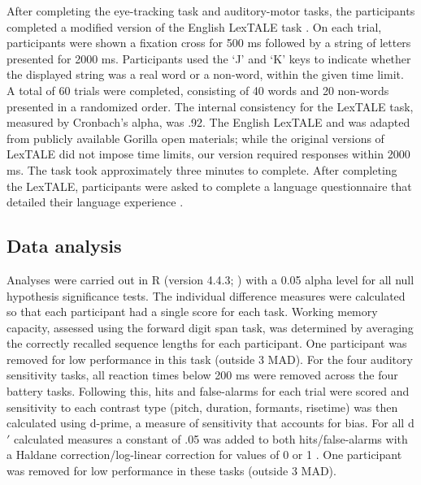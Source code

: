 After completing the eye-tracking task and auditory-motor tasks, the participants completed a modified version of the English LexTALE task \citep{lemhofer2012introducing}. On each trial, participants were shown a fixation cross for 500 ms followed by a string of letters presented for 2000 ms. Participants used the ‘J’ and ‘K’ keys to indicate whether the displayed string was a real word or a non-word, within the given time limit. A total of 60 trials were completed, consisting of 40 words and 20 non-words presented in a randomized order. The internal consistency for the LexTALE task, measured by Cronbach’s alpha, was .92. The English LexTALE and was adapted from publicly available Gorilla open materials; while the original versions of LexTALE did not impose time limits, our version required responses within 2000 ms. The task took approximately three minutes to complete. After completing the LexTALE, participants were asked to complete a language questionnaire that detailed their language experience \citep{Marian_Blumenfeld_Kaushanskaya_2007}. 


\subsection{Data analysis}

Analyses were carried out in R (version 4.4.3; \cite{R}) with a 0.05 alpha level for all null hypothesis significance tests. The individual difference measures were calculated so that each participant had a single score for each task. Working memory capacity, assessed using the forward digit span task, was determined by averaging the correctly recalled sequence lengths for each participant. One participant was removed for low performance in this task (outside 3 MAD). For the four auditory sensitivity tasks, all reaction times below 200 ms were removed across the four battery tasks. Following this, hits and false-alarms for each trial were scored and sensitivity to each contrast type (pitch, duration, formants, risetime) was then calculated using d-prime, a measure of sensitivity that accounts for bias. For all d$'$ calculated measures a constant of .05 was added to both hits/false-alarms with a Haldane correction/log-linear correction for values of 0 or 1 \citep{Hautus1995}. One participant was removed for low performance in these tasks (outside 3 MAD).


